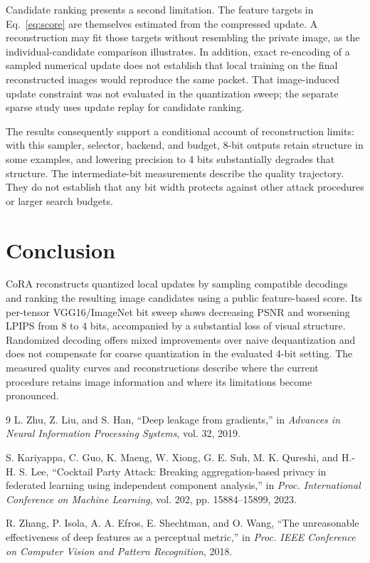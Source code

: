 \documentclass[10pt,twocolumn]{article}
\newcommand{\cora}{CoRA}
\begin{document}
Candidate ranking presents a second limitation. The feature targets in
Eq.~\ref{eq:score} are themselves estimated from the compressed update.
A reconstruction may fit those targets without resembling the private
image, as the individual-candidate comparison illustrates. In addition,
exact re-encoding of a sampled numerical update does not establish that
local training on the final reconstructed images would reproduce the
same packet. That image-induced update constraint was not evaluated in
the quantization sweep; the separate sparse study uses update replay
for candidate ranking.

The results consequently support a conditional account of reconstruction
limits: with this sampler, selector, backend, and budget, 8-bit outputs
retain structure in some examples, and lowering precision to 4 bits
substantially degrades that structure. The intermediate-bit measurements
describe the quality trajectory. They do not establish that any bit
width protects against other attack procedures or larger search budgets.

\section{Conclusion}
\cora{} reconstructs quantized local updates by sampling compatible
decodings and ranking the resulting image candidates using a public
feature-based score. Its per-tensor VGG16/ImageNet bit sweep shows
decreasing PSNR and worsening LPIPS from 8 to 4 bits, accompanied by a
substantial loss of visual structure. Randomized decoding offers mixed
improvements over naive dequantization and does not compensate for
coarse quantization in the evaluated 4-bit setting. The measured quality
curves and reconstructions describe where the current procedure retains
image information and where its limitations become pronounced.

\begin{thebibliography}{9}
L. Zhu, Z. Liu, and S. Han,
``Deep leakage from gradients,''
in \emph{Advances in Neural Information Processing Systems}, vol. 32, 2019.

S. Kariyappa, C. Guo, K. Maeng, W. Xiong, G. E. Suh,
M. K. Qureshi, and H.-H. S. Lee,
``Cocktail Party Attack: Breaking aggregation-based privacy in federated
learning using independent component analysis,''
in \emph{Proc. International Conference on Machine Learning},
vol. 202, pp. 15884--15899, 2023.

R. Zhang, P. Isola, A. A. Efros, E. Shechtman, and O. Wang,
``The unreasonable effectiveness of deep features as a perceptual metric,''
in \emph{Proc. IEEE Conference on Computer Vision and Pattern Recognition},
2018.
\end{thebibliography}
\end{document}
